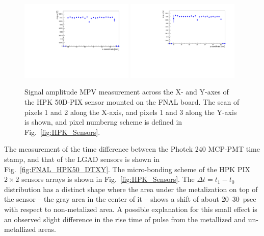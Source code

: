 \documentclass[preprint,1p]{elsarticle}
\begin{document}
\begin{figure}[htbp] 
\centering
\includegraphics[width=0.48\textwidth]{figs/FNALBoard_HPK50DPix_Run847-891/MPV_vs_X_Ch4_5.pdf} 
\includegraphics[width=0.48\textwidth]{figs/FNALBoard_HPK50DPix_Run847-891/MPV_vs_Y_Ch3_4.pdf} 
\caption{Signal amplitude MPV measurement across the X- and Y-axes of the HPK 50D-PIX sensor mounted on the FNAL board. The scan of pixels 1 and 2 along the X-axis, and pixels 1 and 3 along the Y-axis is shown, and pixel numberng scheme is defined in Fig.~\ref{fig:HPK_Sensors}.} 
\label{fig:FNAL_HPK50_MPVXY} 
\end{figure} 



The measurement of the time difference between the Photek 240 MCP-PMT time
stamp, and that of the LGAD sensors is shown in Fig.~\ref{fig:FNAL_HPK50_DTXY}.
The micro-bonding scheme of the HPK PIX $2\times 2$ sensors arrays is shown in
Fig.~\ref{fig:HPK_Sensors}. The $\Delta t = t_{1}-t_{0}$ distribution has a
distinct shape where the area under the metalization on top of the sensor -- the
gray area in the center of it -- shows a shift of about $20$--$30$~psec with
respect to non-metalized area. A possible explanation for this small effect is
an observed slight difference in the rise time of pulse from the metallized and
un-metallized areas. 
\end{document}
